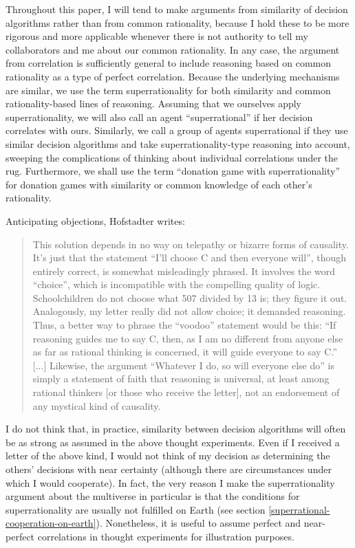 Throughout this paper, I will tend to make arguments from similarity of
decision algorithms rather than from common rationality, because I hold
these to be more rigorous and more applicable whenever there is not
authority to tell my collaborators and me about our common rationality.
In any case, the argument from correlation is sufficiently general to
include reasoning based on common rationality as a type of perfect
correlation. Because the underlying mechanisms are similar, we use the
term superrationality for both similarity and common rationality-based
lines of reasoning. Assuming that we ourselves apply superrationality,
we will also call an agent ``superrational'' if her decision correlates
with ours. Similarly, we call a group of agents superrational if they
use similar decision algorithms and take superrationality-type reasoning
into account, sweeping the complications of thinking about individual
correlations under the rug. Furthermore, we shall use the term
``donation game with superrationality'' for donation games with
similarity or common knowledge of each other's rationality.

Anticipating objections, Hofstadter
\citeyear{Hofstadter1983-az} writes:

\begin{quote}
This solution depends in no way on telepathy or bizarre forms of
causality. It's just that the statement ``I'll choose C and then everyone
will'', though entirely correct, is somewhat misleadingly phrased. It
involves the word ``choice'', which is incompatible with the compelling
quality of logic. Schoolchildren do not choose what 507 divided by 13
is; they figure it out. Analogously, my letter really did not allow
choice; it demanded reasoning. Thus, a better way to phrase the ``voodoo''
statement would be this: ``If reasoning guides me to say C, then, as I am
no different from anyone else as far as rational thinking is concerned,
it will guide everyone to say C.'' {[}...{]} Likewise, the argument
``Whatever I do, so will everyone else do'' is simply a statement of faith
that reasoning is universal, at least among rational thinkers {[}or
those who receive the letter{]}, not an endorsement of any mystical kind
of causality.
\end{quote}

I do not think that, in practice, similarity between decision algorithms
will often be as strong as assumed in the above thought experiments.
Even if I received a letter of the above kind, I would not think of my
decision as determining the others' decisions with near certainty
(although there are circumstances under which I would cooperate). In fact, the
very reason I make the superrationality argument about the multiverse in
particular is that the conditions for superrationality are usually not
fulfilled on Earth (see section
\ref{superrational-cooperation-on-earth}). Nonetheless, it is useful to assume perfect
and near-perfect correlations in thought experiments for illustration
purposes.

